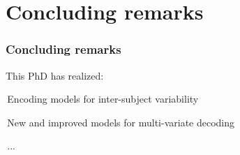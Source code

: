 \documentclass{beamer}
\def\mydot{\structure{\rule{1ex}{1ex}}\,}
\begin{document}
\section{Concluding remarks}
\begin{frame}\Large
  \frametitle{Concluding remarks}
  This PhD has realized:
  
  \mydot Encoding models for inter-subject variability

  \bigskip
  
  \mydot New and improved models for multi-variate decoding

  \bigskip

  \mydot ...
\end{frame}
\end{document}
